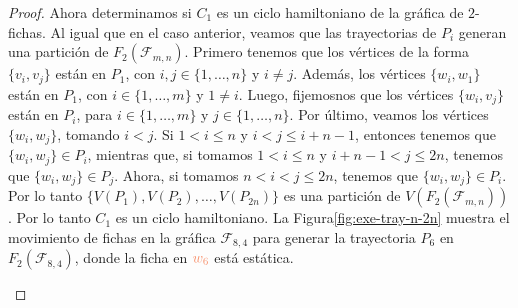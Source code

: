 \begin{proof}
    Ahora determinamos si $C_1$ es un ciclo hamiltoniano de la gr\'afica de
    $2$-fichas. Al igual que en el caso anterior, veamos que las trayectorias de
    $P_i$ generan una partici\'on de $F_2(\mathcal{F}_{m,n})$. Primero tenemos
    que los v\'ertices de la forma $\{v_i,v_j\}$ est\'an en $P_1$, con $i,j \in
    \{1, \dots, n\}$ y $i \neq j$. Adem\'as, los v\'ertices $\{w_i,w_1\}$
    est\'an en $P_1$, con $i \in \{1, \dots, m\}$ y $1 \neq i$. Luego,
    fijemosnos que los v\'ertices $\{w_i,v_j\}$ est\'an en $P_i$, para $i\in
    \{1, \dots, m\}$ y $j \in \{1, \dots, n\}$. Por \'ultimo, veamos los
    v\'ertices $\{w_i,w_j\}$, tomando $i < j$. Si $1 < i \leq n$ y $i < j \leq
    i+n-1$, entonces tenemos que $\{w_i,w_j\} \in P_i$, mientras que, si tomamos
    $1 < i \leq n$ y $i+n-1 < j \leq 2n$, tenemos que $\{w_i,w_j\} \in P_j$.
    Ahora, si tomamos $n<i<j \leq 2n$, tenemos que $\{w_i,w_j\} \in P_i$. Por lo
    tanto $\{V(P_1),V(P_2), \dots, V(P_{2n})\}$ es una partici\'on de
    $V(F_2(\mathcal{F}_{m,n}))$. Por lo tanto $C_1$ es un ciclo hamiltoniano. La
    Figura\ref{fig:exe-tray-n-2n} muestra el movimiento de fichas en la
    gr\'afica $\mathcal{F}_{8,4}$ para generar la trayectoria $P_6$ en
    $F_2(\mathcal{F}_{8,4})$, donde la ficha en ${\color{coral}w_6}$ est\'a
    est\'atica.


\begin{figure}[ht!]
    \centering
\end{figure}
\end{proof}

